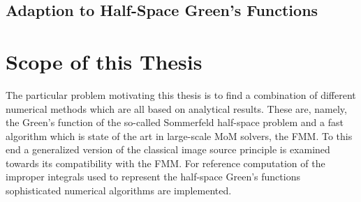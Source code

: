 \subsection{Adaption to Half-Space Green's Functions}

\cite{Geng2000}
\cite{Liu2002}
\cite{Eibert2018}
\cite{Eibert2018a}
\cite{Eibert2019}
\cite[Chapter~8.13.2]{parini2020}


\section{Scope of this Thesis}
\label{sec:scope_of_this_thesis}

The particular problem motivating this thesis is to find a combination of
different numerical methods which are all based on analytical results.
These are, namely, the Green's function of the so-called Sommerfeld half-space
problem and a fast algorithm which is state of the art in large-scale \ac{MoM}
solvers, the \ac{FMM}.
To this end a generalized version of the classical image source principle is
examined towards its compatibility with the \ac{FMM}.
For reference computation of the improper integrals used to represent the
half-space Green's functions sophisticated numerical algorithms are implemented.
